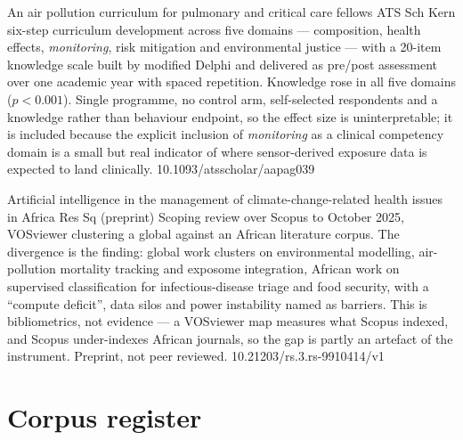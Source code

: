 \documentclass[10pt]{article}
\begin{document}
{An air pollution curriculum for pulmonary and critical care fellows}
{ATS Sch}
{Kern six-step curriculum development across five domains --- composition, health effects,
\emph{monitoring}, risk mitigation and environmental justice --- with a 20-item knowledge
scale built by modified Delphi and delivered as pre/post assessment over one academic
year with spaced repetition. Knowledge rose in all five domains ($p<0.001$). Single
programme, no control arm, self-selected respondents and a knowledge rather than
behaviour endpoint, so the effect size is uninterpretable; it is included because the
explicit inclusion of \emph{monitoring} as a clinical competency domain is a small but
real indicator of where sensor-derived exposure data is expected to land clinically.}
{10.1093/atsscholar/aapag039}

{Artificial intelligence in the management of climate-change-related health issues in Africa}
{Res Sq (preprint)}
{Scoping review over Scopus to October 2025, VOSviewer clustering a global against an
African literature corpus. The divergence is the finding: global work clusters on
environmental modelling, air-pollution mortality tracking and exposome integration,
African work on supervised classification for infectious-disease triage and food
security, with a ``compute deficit'', data silos and power instability named as barriers.
This is bibliometrics, not evidence --- a VOSviewer map measures what Scopus indexed, and
Scopus under-indexes African journals, so the gap is partly an artefact of the
instrument. Preprint, not peer reviewed.}
{10.21203/rs.3.rs-9910414/v1}

\clearpage

\section*{\sffamily\bfseries\color{Deep}Corpus register}
\vspace{-1.5mm}{\color{Amber}\rule{\linewidth}{1.1pt}}\vspace{2.5mm}


\end{document}
